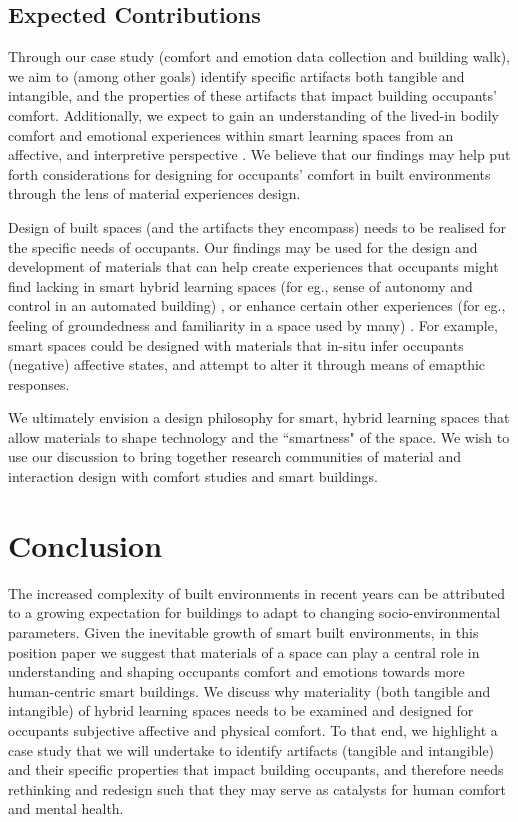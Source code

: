 \documentclass[acmconf, anonymous, review]{acmart}
\begin{document}
\subsection{Expected Contributions}
Through our case study (comfort and emotion data collection and building walk), we aim to (among other goals) identify specific artifacts both tangible and intangible, and the properties of these artifacts that impact building occupants' comfort. Additionally, we expect to gain an understanding of the lived-in bodily comfort and emotional experiences within smart learning spaces from an affective, and interpretive perspective \cite{giaccardi2015foundations}. We believe that our findings may help put forth considerations for designing for occupants' comfort in built environments through the lens of material experiences design. 

Design of built spaces (and the artifacts they encompass) needs to be realised for the specific needs of occupants. Our findings may be used for the design and development of materials that can help create experiences that occupants might find lacking in smart hybrid learning spaces (for eg., sense of autonomy and control in an automated building) \cite{moreno2014user}, or enhance certain other experiences (for eg., feeling of groundedness and familiarity in a space used by many) \cite{rehman2022personalisedcomfort}.  For example, 
smart spaces could be designed with materials that in-situ infer occupants (negative) affective states, and attempt to alter it through means of emapthic responses. 

We ultimately envision a design philosophy for smart, hybrid learning spaces that allow materials to shape technology and the ``smartness" of the space. We wish to use our discussion to bring together research communities of material and interaction design with comfort studies and smart buildings.


\section{Conclusion}
The increased complexity of built environments in recent years can be attributed to a growing expectation for buildings to adapt to changing socio-environmental parameters. Given the inevitable growth of smart built environments, in this position paper we suggest that materials of a space can play a central role in understanding and shaping occupants comfort and emotions towards more human-centric smart buildings. We discuss why materiality (both tangible and intangible) of hybrid learning spaces needs to be examined and designed for occupants subjective affective and physical comfort. To that end, we highlight a case study that we will undertake to identify artifacts (tangible and intangible) and their specific properties that impact building occupants, and therefore needs rethinking and  redesign such that they may serve as catalysts for human comfort and mental health. 




\end{document}
